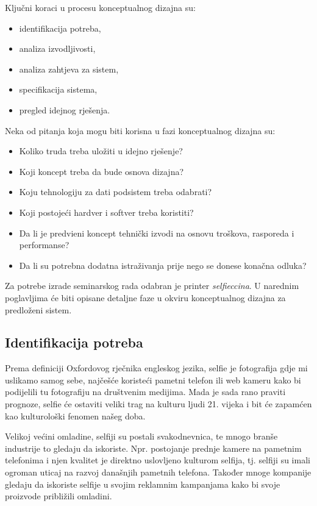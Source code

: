 \documentclass[12pt]{article}
\begin{document}
Klju\v{c}ni koraci u procesu konceptualnog dizajna su:
\begin{itemize}
\item identifikacija potreba,
\item analiza izvodljivosti,
\item analiza zahtjeva za sistem,
\item specifikacija sistema,
\item pregled idejnog rje\v{s}enja. \cite{wiki1}
\end{itemize}

Neka od pitanja koja mogu biti korisna u fazi konceptualnog dizajna su:
\begin{itemize}
\item Koliko truda treba ulo\v{z}iti u idejno rje\v{s}enje?
\item Koji koncept treba da bude osnova dizajna? 
\item Koju tehnologiju za dati podsistem treba odabrati?
\item Koji postoje\'ci hardver i softver treba koristiti?
\item Da li je predvi\dj eni koncept tehni\v{c}ki izvodi na osnovu tro\v{s}kova, rasporeda i performanse?
\item Da li su potrebna dodatna istra\v{z}ivanja prije nego se donese kona\v{c}na odluka? \cite{book1}
\end{itemize}

Za potrebe izrade seminarskog rada odabran je printer \textit{selfieccina}. U narednim poglavljima će biti opisane detaljne faze u okviru konceptualnog dizajna za predloženi sistem.

\newpage

\subsection{Identifikacija potreba}

Prema definiciji Oxfordovog rječnika engleskog jezika, selfie je fotografija gdje mi uslikamo samog sebe, najčešće koristeći pametni telefon ili web kameru kako bi podijelili tu fotografiju na društvenim medijima. Mada je sada rano praviti prognoze, selfie će ostaviti veliki trag na kulturu ljudi 21. vijeka i bit će zapamćen kao kulturološki fenomen našeg doba. 

Velikoj većini omladine, selfiji su postali svakodnevnica, te mnogo branše industrije to gledaju da iskoriste. Npr. postojanje prednje kamere na pametnim telefonima i njen kvalitet je direktno uslovljeno kulturom selfija, tj. selfiji su imali ogroman uticaj na razvoj današnjih pametnih telefona. Također mnoge kompanije gledaju da iskoriste selfije u svojim reklamnim kampanjama kako bi svoje proizvode približili omladini. 
\end{document}

